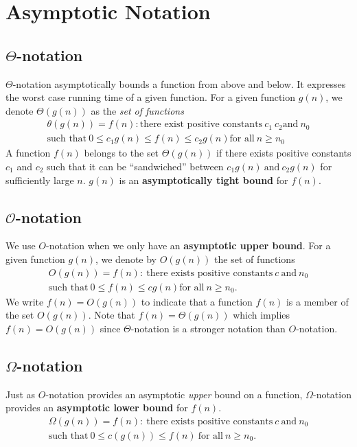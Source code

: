 \documentclass[]{book}
\begin{document}
  \mainmatter
  \chapter{Asymptotic Notation}
    \section{$\Theta$-notation}
      $\Theta$-notation asymptotically bounds a function from above and below. It expresses
      the worst case running time of a given function. For a given function $g(n)$, we denote
      $\Theta(g(n))$ as the \textit{set of functions}
      \begin{multline*}
        \theta(g(n)) = f(n): \text{there exist positive constants}\ c_1\ c_2 \text{and}\ n_0\\
        \text{such that}\ 0 \leq c_1g(n) \leq f(n) \leq c_2g(n) \text{for all}\ n\geq n_0
      \end{multline*}
      A function $f(n)$ belongs to the set $\Theta(g(n))$ if there exists positive constants
      $c_1$ and $c_2$ such that it can be ``sandwiched'' between $c_1g(n)\ \text{and}\ c_2g(n)$ for
      sufficiently large $n$. $g(n)$ is an \textbf{asymptotically tight bound} for $f(n)$.
    \section{$\mathcal{O}$-notation}
      We use $O$-notation when we only have an \textbf{asymptotic upper bound}.
      For a given function $g(n)$, we denote by $O(g(n))$ the set of functions
      \begin{multline*}
        O(g(n))=f(n):\ \text{there exists positive constants}\ c\ \text{and}\ n_0\\
        \text{such that}\ 0 \leq f(n) \leq cg(n) \text{for all}\ n \geq n_0.
      \end{multline*}
      We write $f(n) = O(g(n))$ to indicate that a function $f(n)$ is a member of
      the set $O(g(n))$. Note that $f(n) = \Theta(g(n))$ which implies $f(n) = O(g(n))$ since
      $\Theta$-notation is a stronger notation than $O$-notation.
    \section{$\Omega$-notation}
      Just as $O$-notation provides an asymptotic \textit{upper} bound on a function,
      $\Omega$-notation provides an \textbf{asymptotic lower bound} for $f(n)$.
      \begin{multline*}
        \Omega(g(n)) = f(n):\ \text{there exists positive constants}\ c\ \text{and}\ n_0\\
        \text{such that}\ 0 \leq c(g(n)) \leq f(n)\ \text{for all}\ n \geq n_0.
      \end{multline*}
\end{document}
